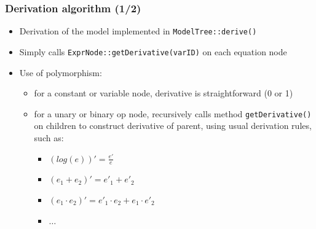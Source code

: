 \documentclass{beamer}
\begin{document}
\begin{frame}
  \frametitle{Derivation algorithm (1/2)}
  \begin{itemize}
  \item Derivation of the model implemented in \texttt{ModelTree::derive()}
  \item Simply calls \texttt{ExprNode::getDerivative(varID)} on each equation node
  \item Use of polymorphism:
    \begin{itemize}
    \item for a constant or variable node, derivative is straightforward (0 or 1)
    \item for a unary or binary op node, recursively calls method \texttt{getDerivative()} on children to construct derivative of parent, using usual derivation rules, such as:
      \begin{itemize}
      \item $(log(e))' = \frac{e'}{e}$
      \item $(e_1 + e_2)' = e'_1 + e'_2$
      \item $(e_1 \cdot e_2)' = e'_1\cdot e_2 + e_1\cdot e'_2$
      \item $\ldots$
      \end{itemize}
    \end{itemize}
  \end{itemize}
\end{frame}
\end{document}
